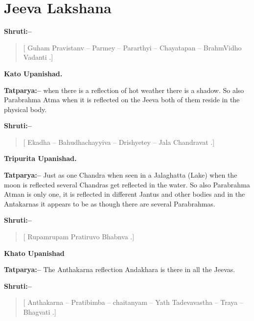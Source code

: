 \chapter{Jeeva Lakshana}

\textbf{Shruti:–}

\begin{verse}
[ Guham Pravistanv – Parmey – Pararthyi – Chayatapan – BrahmVidho Vadanti .]
\end{verse}

\begin{flushright}
\textbf{Kato Upanishad.}
\end{flushright}

\textbf{Tatparya:–} when there is a reflection of hot weather there is a shadow. So also Parabrahma Atma when it is reflected on the Jeeva both of them reside in the physical body.

\textbf{Shruti:–}

\begin{verse}
[ Ekadha – Bahudhachayyiva – Drishyetey – Jala Chandravat .]
\end{verse}

\begin{flushright}
\textbf{Tripurita Upanishad.}
\end{flushright}

\textbf{Tatparya:–} Just as one Chandra when seen in a Jalaghatta (Lake) when the moon is reflected several Chandras get reflected in the water. So also Parabrahma Atman is only one, it is reflected in different Jantus and other bodies and in the Antakarnas it appears to be as though there are several Parabrahmas.

\textbf{Shruti:–}

\begin{verse}
[ Rupamrupam Pratiruvo Bhabnva .]
\end{verse}

\begin{flushright}
\textbf{Khato Upanishad}
\end{flushright}

\textbf{Tatparya:–} The Anthakarna reflection Andakhara is there in all the Jeevas.

\textbf{Shruti:–}

\begin{verse}
[ Anthakarna – Pratibimba – chaitanyam – Yath Tadevavastha – Traya – Bhagvati .]
\end{verse}

